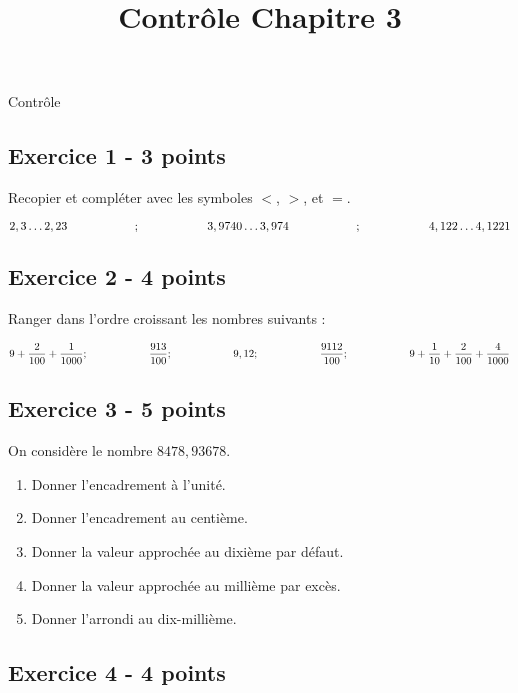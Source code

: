 \documentclass[12 pt]{extarticle}
\title{Contrôle Chapitre 3}
\date{}
\theoremstyle{plain}
\begin{document}
\begin{center}{\Large Contrôle}\\ 
 \end{center}
 
 \subsection*{Exercice 1 - 3 points} 
 
 Recopier et compléter avec les symboles $<$, $>$, et $=$. 
 
 \[ 2,3 \ldots 2, 23 \hspace{2 cm}; \hspace{2 cm}
 3, 9740 \ldots 3, 974 \hspace{2 cm}; \hspace{2 cm}
 4,122 \ldots 4, 1221\]
 
 \subsection*{Exercice 2 - 4 points}
 
 Ranger dans l'ordre croissant les nombres suivants : 
 
 \[ 
 9 + \frac{2}{100} + \frac{1}{1000}; \hspace{2 cm}
 \frac{913}{100}; \hspace{2 cm}
 9,12    ; \hspace{2 cm}
 \frac{9112}{100} ; \hspace{2 cm}
 9 + \frac1{10} + \frac2{100} + \frac4{1000}
 \]
 
 \subsection*{Exercice 3 - 5 points}
 
 On considère le nombre $8 478, 936 78$. \begin{enumerate}
 \item Donner l'encadrement à l'unité. 
 \item Donner l'encadrement au centième. 
 \item Donner la valeur approchée au dixième par défaut. 
 \item Donner la valeur approchée au millième par excès. 
 \item Donner l'arrondi au dix-millième. 
 \end{enumerate}
 
 \subsection*{Exercice 4 - 4 points}
 
\end{document}
